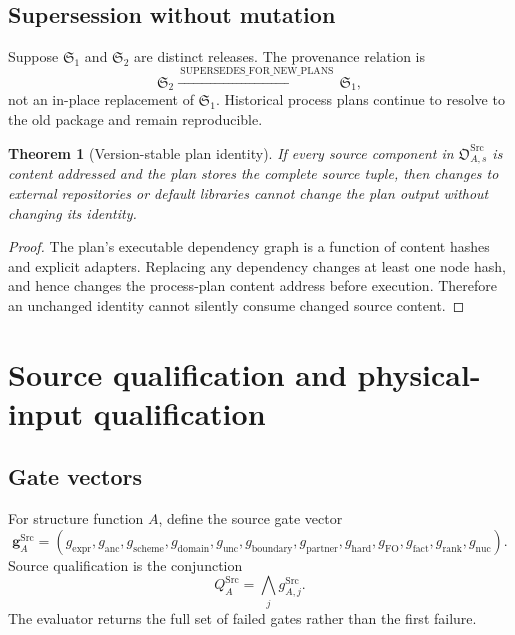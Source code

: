 \documentclass[11pt]{article}
\newtheorem{theorem}[definition]{Theorem}
\newcommand{\Src}{\ensuremath{\mathrm{Src}}}
\begin{document}
\subsection{Supersession without mutation}

Suppose \(\mathfrak S_1\) and \(\mathfrak S_2\) are distinct releases.  The provenance relation is
\begin{equation}
 \mathfrak S_2
 \xrightarrow{\ \mathrm{SUPERSEDES\_FOR\_NEW\_PLANS}\ }
 \mathfrak S_1,
 \label{eq:supersession}
\end{equation}
not an in-place replacement of \(\mathfrak S_1\).  Historical process plans continue to resolve to the old package and remain reproducible.

\begin{theorem}[Version-stable plan identity]
If every source component in \(\mathfrak O_{A,s}^{\Src}\) is content addressed and the plan stores the complete source tuple, then changes to external repositories or default libraries cannot change the plan output without changing its identity.
\end{theorem}

\begin{proof}
The plan's executable dependency graph is a function of content hashes and explicit adapters.  Replacing any dependency changes at least one node hash, and hence changes the process-plan content address before execution.  Therefore an unchanged identity cannot silently consume changed source content.
\end{proof}

\section{Source qualification and physical-input qualification}
\label{sec:qualification}

\subsection{Gate vectors}

For structure function \(A\), define the source gate vector
\begin{equation}
 \bm g_A^{\Src}
 =
 \left(
 g_{\mathrm{expr}},
 g_{\mathrm{anc}},
 g_{\mathrm{scheme}},
 g_{\mathrm{domain}},
 g_{\mathrm{unc}},
 g_{\mathrm{boundary}},
 g_{\mathrm{partner}},
 g_{\mathrm{hard}},
 g_{\mathrm{FO}},
 g_{\mathrm{fact}},
 g_{\mathrm{rank}},
 g_{\mathrm{nuc}}
 \right).
 \label{eq:source-gate-vector}
\end{equation}
Source qualification is the conjunction
\begin{equation}
 Q_A^{\Src}
 =
 \bigwedge_j g_{A,j}^{\Src}.
 \label{eq:source-qualification}
\end{equation}
The evaluator returns the full set of failed gates rather than the first failure.
\end{document}

